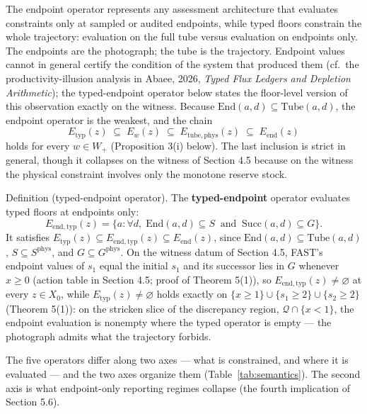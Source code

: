 \documentclass[3p,11pt]{elsarticle}
\begin{document}
The endpoint operator represents any assessment architecture that evaluates constraints only at sampled or audited endpoints, while typed floors constrain the whole trajectory: evaluation on the full tube versus evaluation on endpoints only. The endpoints are the photograph; the tube is the trajectory. Endpoint values cannot in general certify the condition of the system that produced them (cf.\ the productivity-illusion analysis in Abaee, 2026, \emph{Typed Flux Ledgers and Depletion Arithmetic}); the typed-endpoint operator below states the floor-level version of this observation exactly on the witness. Because \(\mathrm{End}(a,d) \subseteq \mathrm{Tube}(a,d)\), the
endpoint operator is the weakest, and the chain
\[E_{\mathrm{typ}}(z) \;\subseteq\; E_w(z) \;\subseteq\; E_{\mathrm{tube,phys}}(z) \;\subseteq\; E_{\mathrm{end}}(z)\]
holds for every \(w \in W_+\) (Proposition 3(i) below). The last
inclusion is strict in general, though it collapses on the witness of
Section 4.5 because on the witness the physical constraint involves only the monotone reserve stock.

Definition (typed-endpoint operator). The \textbf{typed-endpoint} operator evaluates typed floors at endpoints only:
\[E_{\mathrm{end,typ}}(z) = \{ a : \forall d,\; \mathrm{End}(a,d) \subseteq S \ \text{ and } \ \mathrm{Succ}(a,d) \subseteq G \}.\]
It satisfies \(E_{\mathrm{typ}}(z) \subseteq E_{\mathrm{end,typ}}(z) \subseteq E_{\mathrm{end}}(z)\), since \(\mathrm{End}(a,d) \subseteq \mathrm{Tube}(a,d)\), \(S \subseteq S^{\mathrm{phys}}\), and \(G \subseteq G^{\mathrm{phys}}\). On the witness datum of Section 4.5, FAST's endpoint values of \(s_1\) equal the initial \(s_1\) and its successor lies in \(G\) whenever \(x \ge 0\) (action table in Section 4.5; proof of Theorem 5(1)), so \(E_{\mathrm{end,typ}}(z) \neq \varnothing\) at every \(z \in X_0\), while \(E_{\mathrm{typ}}(z) \neq \varnothing\) holds exactly on \(\{x \ge 1\} \cup \{s_1 \ge 2\} \cup \{s_2 \ge 2\}\) (Theorem 5(1)): on the stricken slice of the discrepancy region, \(\mathcal{Q} \cap \{x < 1\}\), the endpoint evaluation is nonempty where the typed operator is empty --- the photograph admits what the trajectory forbids.

\medskip

\noindent The five operators differ along two axes --- what is
constrained, and where it is evaluated --- and the two axes organize them
(Table~\ref{tab:semantics}). The second axis is what endpoint-only
reporting regimes collapse (the fourth implication of Section 5.6).
\end{document}
